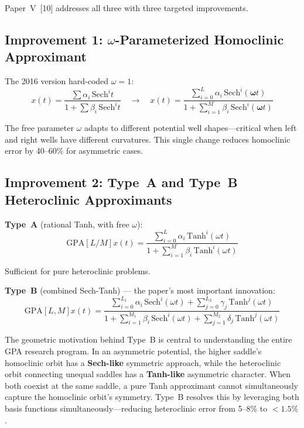 \documentclass[11pt,a4paper]{article}
\begin{document}
Paper~V~[10] addresses all three with three targeted improvements.

\subsection{Improvement 1: $\omega$-Parameterized Homoclinic Approximant}

The 2016 version hard-coded $\omega = 1$:
\begin{equation}
x(t) = \frac{\sum \alpha_i \, \text{Sech}^i t}{1 + \sum \beta_i \, \text{Sech}^i t}
\quad\longrightarrow\quad
\boxed{x(t) = \frac{\sum_{i=0}^{L} \alpha_i \, \text{Sech}^i(\boldsymbol{\omega} t)}{1 + \sum_{i=1}^{M} \beta_i \, \text{Sech}^i(\boldsymbol{\omega} t)}}
\label{eq:omega_free}
\end{equation}

The free parameter $\omega$ adapts to different potential well shapes---critical when left and right wells have different curvatures. This single change reduces homoclinic error by 40--60\% for asymmetric cases.

\subsection{Improvement 2: Type~A and Type~B Heteroclinic Approximants}

\textbf{Type~A} (rational Tanh, with free $\omega$):
\begin{equation}
\text{GPA}[L/M]x(t) = \frac{\sum_{i=0}^{L} \alpha_i \, \text{Tanh}^i(\omega t)}{1 + \sum_{i=1}^{M} \beta_i \, \text{Tanh}^i(\omega t)}
\label{eq:type_a}
\end{equation}

Sufficient for pure heteroclinic problems.

\textbf{Type~B} (combined Sech-Tanh) --- the paper's most important innovation:
\begin{equation}
\boxed{\text{GPA}[L,M]x(t) = \frac{\sum_{i=0}^{L_1} \alpha_i \, \text{Sech}^i(\omega t) + \sum_{j=0}^{L_2} \gamma_j \, \text{Tanh}^j(\omega t)}{1 + \sum_{i=1}^{M_1} \beta_i \, \text{Sech}^i(\omega t) + \sum_{j=1}^{M_2} \delta_j \, \text{Tanh}^j(\omega t)}}
\label{eq:type_b}
\end{equation}

The geometric motivation behind Type~B is central to understanding the entire GPA research program. In an asymmetric potential, the higher saddle's homoclinic orbit has a \textbf{Sech-like} symmetric approach, while the heteroclinic orbit connecting unequal saddles has a \textbf{Tanh-like} asymmetric character. When both coexist at the same saddle, a pure Tanh approximant cannot simultaneously capture the homoclinic orbit's symmetry. Type~B resolves this by leveraging both basis functions simultaneously---reducing heteroclinic error from 5--8\% to $<1.5\%$.
\end{document}

